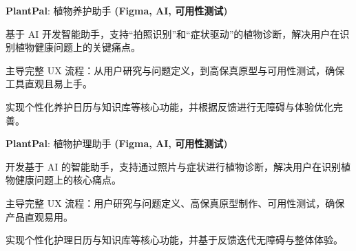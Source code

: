\begin{twocolentry}{}{}
\textbf{PlantPal}: 植物养护助手 \textbf{(Figma, AI, 可用性测试)}
\end{twocolentry}
\begin{onecolentry}
\begin{highlights}
\item 基于 AI 开发智能助手，支持“拍照识别”和“症状驱动”的植物诊断，解决用户在识别植物健康问题上的关键痛点。
\item 主导完整 UX 流程：从用户研究与问题定义，到高保真原型与可用性测试，确保工具直观且易上手。
\item 实现个性化养护日历与知识库等核心功能，并根据反馈进行无障碍与体验优化完善。
\end{highlights}
\end{onecolentry}

\begin{twocolentry}{}{}
\textbf{PlantPal}: 植物护理助手 \textbf{(Figma, AI, 可用性测试)}
\end{twocolentry}
\begin{onecolentry}
\begin{highlights}
\item 开发基于 AI 的智能助手，支持通过照片与症状进行植物诊断，解决用户在识别植物健康问题上的核心痛点。
\item 主导完整 UX 流程：用户研究与问题定义、高保真原型制作、可用性测试，确保产品直观易用。
\item 实现个性化护理日历与知识库等核心功能，并基于反馈迭代无障碍与整体体验。
\end{highlights}
\end{onecolentry}
